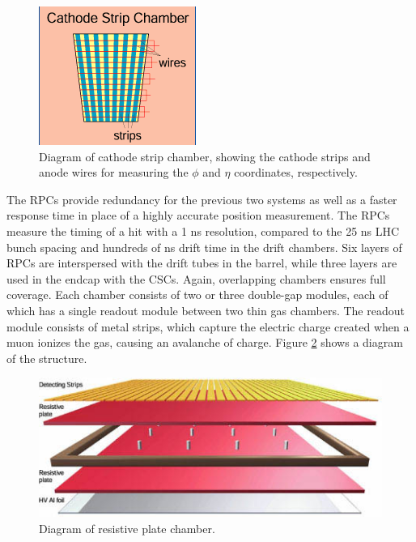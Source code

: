  \begin{figure}[htb]
  \begin{center}
    \includegraphics[]{Figures/muon-CSC-structure.png}
  \end{center}
  \caption[\fixspacing Diagram of cathode strip chamber]
	  {\fixspacing Diagram of cathode strip chamber, 
	    showing the cathode strips and anode wires 
	    for measuring the $\phi$ and $\eta$ coordinates, respectively.}
  \label{fig:CSCstructure}
 \end{figure}

The RPCs provide redundancy for the previous 
two systems as well as a faster response time 
in place of a highly accurate position measurement.  
The RPCs measure the timing of a hit with a 
1 ns resolution, compared to the 25 ns LHC bunch spacing 
and hundreds of ns drift time in the drift chambers.  
Six layers of RPCs are interspersed with the 
drift tubes in the barrel, 
while three layers are used in the endcap 
with the CSCs.  
Again, overlapping chambers ensures full coverage.  
Each chamber consists of two or three double-gap 
modules, each of which has a single readout module 
between two thin gas chambers.  
The readout module consists of metal strips, 
which capture the electric charge created when 
a muon ionizes the gas, causing an avalanche of charge.  
Figure \ref{fig:RPClayers} shows a diagram of the structure.  

 \begin{figure}[htb]
  \begin{center}
    \includegraphics[width=360pt]{Figures/muon-RPClayers.jpg}
  \end{center}
  \caption[\fixspacing Diagram of resistive plate chamber]
	  {\fixspacing Diagram of resistive plate chamber.}
  \label{fig:RPClayers}
 \end{figure}

